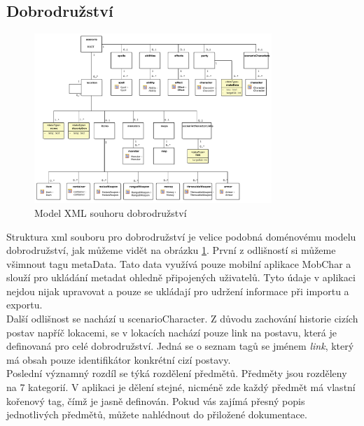 \documentclass[thesis=B,czech]{resources/FITthesis}[2012/06/26]
\begin{document}
\subsection{Dobrodružství}
\begin{figure}\centering
	\includegraphics[width=0.8\textwidth]{images/scenarioXML}
	\caption[Model XML souhoru dobrodružství]{Model XML souhoru dobrodružství}\label{fig:xml_scenario}
\end{figure}
Struktura xml souboru pro dobrodružství je velice podobná doménovému modelu dobrodružství, jak můžeme vidět na obrázku \ref{fig:xml_scenario}. První z odlišností si můžeme všimnout tagu \clqq metaData\crqq . Tato data využívá pouze mobilní aplikace MobChar a slouží pro ukládání metadat ohledně připojených uživatelů. Tyto údaje v aplikaci nejdou nijak upravovat a pouze se ukládají pro udržení informace při importu a exportu. \\
Další odlišnost se nachází u \clqq scenarioCharacter\crqq . Z důvodu zachování historie cizích postav napříč lokacemi, se v lokacích nachází pouze link na postavu, která je definovaná pro celé dobrodružství. Jedná se o seznam tagů se jménem \textit{link}, který má obsah pouze identifikátor konkrétní cizí postavy. \\
Poslední významný rozdíl se týká rozdělení předmětů. Předměty jsou rozděleny na 7 kategorií. V aplikaci je dělení stejné, nicméně zde každý předmět má vlastní kořenový tag, čímž je jasně definován. Pokud vás zajímá přesný popis jednotlivých předmětů, můžete nahlédnout do přiložené dokumentace. \\
\end{document}
